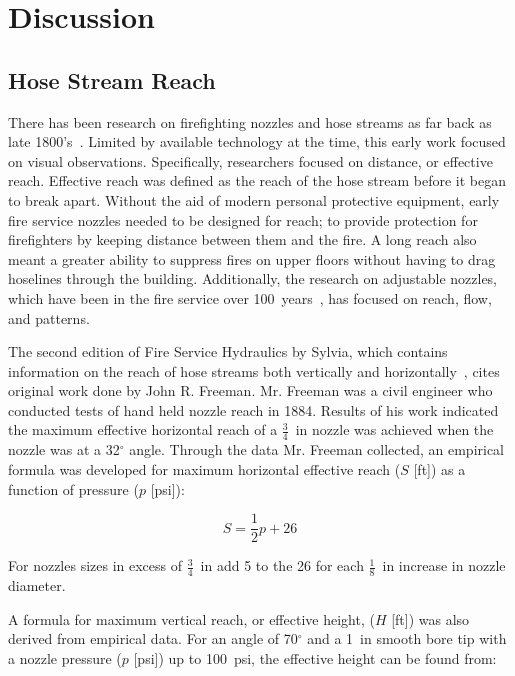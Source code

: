 \documentclass[12pt,oneside]{book}
\begin{document}
\chapter{Discussion}

\section{Hose Stream Reach}
\label{sec:hose_reach}
There has been research on firefighting nozzles and hose streams as far back as late 1800's~\cite{CHICAGO_TRIBUNE:1339:a}. Limited by available technology at the time, this early work focused on visual observations. Specifically, researchers focused on distance, or effective reach. Effective reach was defined as the reach of the hose stream before it began to break apart. Without the aid of modern personal protective equipment, early fire service nozzles needed to be designed for reach; to provide protection for firefighters by keeping distance between them and the fire. A long reach also meant a greater ability to suppress fires on upper floors without having to drag hoselines through the building. Additionally, the research on adjustable nozzles, which have been in the fire service over 100~years~\cite{PALMER:1878}, has focused on reach, flow, and patterns. 

The second edition of Fire Service Hydraulics by Sylvia, which contains information on the reach of hose streams both vertically and horizontally~\cite{SYLVIA:1970}, cites original work done by John R. Freeman. Mr. Freeman was a civil engineer who conducted tests of hand held nozzle reach in 1884. Results of his work indicated the maximum effective horizontal reach of a $\frac{3}{4}$~in nozzle was achieved when the nozzle was at a 32$^\circ$ angle. Through the data Mr. Freeman collected, an empirical formula was developed for maximum horizontal effective reach ($S$ [ft]) as a function of pressure ($p$ [psi]): 

\begin{equation*}
	S = \frac{1}{2}p+26
\end{equation*}

For nozzles sizes in excess of $\frac{3}{4}$~in add 5 to the 26 for each $\frac{1}{8}$~in increase in nozzle diameter. 

A formula for maximum vertical reach, or effective height, ($H$ [ft]) was also derived from empirical data. For an angle of 70$^{\circ}$ and a 1~in smooth bore tip with a nozzle pressure ($p$ [psi]) up to 100~psi, the effective height can be found from:
\end{document}
